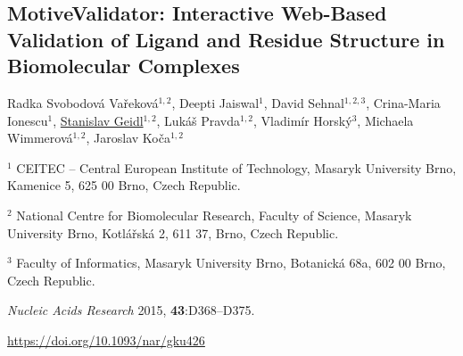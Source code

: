 \begin{center}
\section{\centering MotiveValidator: Interactive
Web-Based Validation of Ligand and Residue Structure in Biomolecular Complexes}

Radka Svobodová Vařeková$^{1, 2}$,
Deepti Jaiswal$^1$,
David Sehnal$^{1, 2, 3}$,
Crina-Maria Ionescu$^1$,
\underline{Stanislav Geidl}$^{1, 2}$,
Lukáš Pravda$^{1, 2}$,
Vladimír Horský$^3$,
Michaela Wimmerová$^{1, 2}$,
Jaroslav Koča$^{1, 2}$

\vspace{1cm}

$^1$ CEITEC -- Central European Institute of Technology,
Masaryk University Brno, Kamenice 5, 625 00 Brno, Czech Republic.

$^2$ National Centre for Biomolecular Research, Faculty of Science,
Masaryk University Brno, Kotlářská 2, 611 37, Brno, Czech Republic.

$^3$ Faculty of Informatics, Masaryk University Brno, Botanická 68a, 602 00 Brno,
Czech Republic.

\vspace{1cm}

\textit{Nucleic Acids Research} 2015, \textbf{43}:D368--D375.

\vspace{1cm}

\url{https://doi.org/10.1093/nar/gku426}

\end{center}



